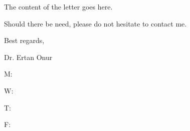 \documentclass[11pt,a4paper]{article}
\begin{document}


\vspace*{0.1cm}


The content of the letter goes here. 

\lipsum[1]

Should there be need, please do not hesitate to contact me.

Best regards,
\vspace*{2cm}



\par Dr. Ertan Onur
\par M: \printemail
\par W: \printweb
\par T: \printtel
\par F: \printfax
\end{document}
